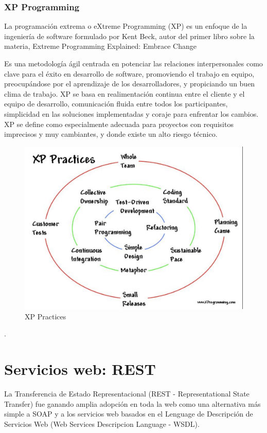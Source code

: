 \documentclass[a4paper,11pt]{book}
\begin{document}
\subsubsection{XP Programming}
La programación extrema o eXtreme Programming (XP) es un enfoque de la ingeniería de software formulado por Kent Beck, autor del primer libro sobre la materia, Extreme Programming Explained: Embrace Change\cite{xp}

Es una metodología ágil centrada en potenciar las relaciones interpersonales como clave para el éxito en desarrollo de software, promoviendo el trabajo en equipo, preocupándose por el aprendizaje de los desarrolladores, y propiciando un buen clima de trabajo. XP se basa en realimentación continua entre el cliente y el equipo de desarrollo, comunicación fluida entre todos los participantes, simplicidad en las soluciones implementadas y coraje para enfrentar los cambios. XP se define como especialmente adecuada para proyectos con requisitos imprecisos y muy cambiantes, y donde existe un alto riesgo técnico.

\begin{figure}[H]  
\centering 
\includegraphics[scale=0.35]{imagenes/xp.png}
\caption{ XP Practices\cite{xp2} }  
\end{figure}


.  

\section{Servicios web: REST}

La Transferencia de Estado Representacional (REST - Representational State Transfer) fue ganando amplia adopción en toda la web como una alternativa más simple a SOAP y a los servicios web basados en el Lenguage de Descripción de Servicios Web (Web Services Descripcion Language - WSDL). 
\end{document}
